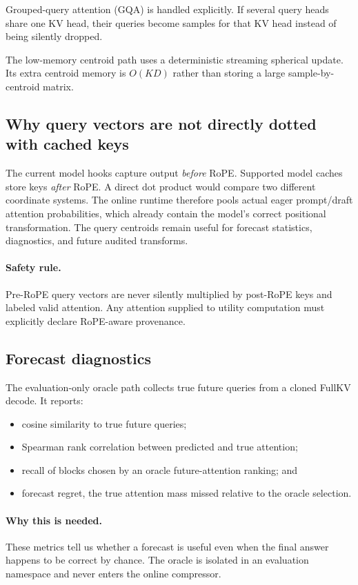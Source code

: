\documentclass[11pt]{article}
\newcommand{\code}[1]{\texttt{\detokenize{#1}}}
\newcommand{\why}{\paragraph{Why this is needed.}}
\newcommand{\safety}{\paragraph{Safety rule.}}
\begin{document}
Grouped-query attention (GQA) is handled explicitly. If several query heads share one KV head, their
queries become samples for that KV head instead of being silently dropped.

The low-memory centroid path uses a deterministic streaming spherical update. Its extra centroid
memory is $O(KD)$ rather than storing a large sample-by-centroid matrix.

\subsection{Why query vectors are not directly dotted with cached keys}

The current model hooks capture \code{q_proj} output \emph{before} RoPE. Supported model caches
store keys \emph{after} RoPE. A direct dot product would compare two different coordinate systems.
The online runtime therefore pools actual eager prompt/draft attention probabilities, which
already contain the model's correct positional transformation. The query centroids remain useful
for forecast statistics, diagnostics, and future audited transforms.

\safety Pre-RoPE query vectors are never silently multiplied by post-RoPE keys and labeled valid
attention. Any attention supplied to utility computation must explicitly declare RoPE-aware
provenance.

\subsection{Forecast diagnostics}

The evaluation-only oracle path collects true future queries from a cloned FullKV decode. It
reports:

\begin{itemize}
  \item cosine similarity to true future queries;
  \item Spearman rank correlation between predicted and true attention;
  \item recall of blocks chosen by an oracle future-attention ranking; and
  \item forecast regret, the true attention mass missed relative to the oracle selection.
\end{itemize}

\why These metrics tell us whether a forecast is useful even when the final answer happens to be
correct by chance. The oracle is isolated in an evaluation namespace and never enters the online
compressor.
\end{document}
